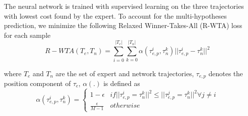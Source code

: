 The neural network is trained with supervised learning on the three trajectories with lowest cost found by the expert. To account for
the multi-hypotheses prediction, we minimize the following Relaxed Winner-Takes-All (R-WTA) loss for each sample
\begin{equation}
	R-WTA(T_e,T_n) = \sum^{|T_e|}_{i=0}\sum^{|T_n|}_{k=0} \alpha(\tau^i_{e,p},\tau^k_n)||\tau^i_{e,p}-\tau^k_n||^2
\end{equation}

where $T_e$ and $T_n$ are the set of expert and network trajectories, $\tau_{e,p}$ denotes the position component of $\tau_e$, $\alpha(.)$ is defined as 
\begin{equation}
	\alpha(\tau^i_{e,p}, \tau^k_n) = 
	\begin{cases}
		1-\epsilon & if ||\tau^i_{e,p}=\tau^k_n||^2 \le ||\tau^j_{e,p}=\tau^k_n||^2 \forall j \ne i \\
		\frac{\epsilon}{M-1} & otherwise
	\end{cases}
\end{equation}

